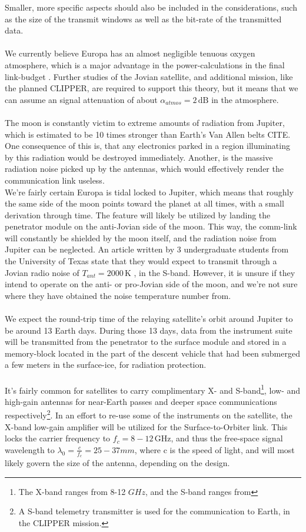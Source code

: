 Smaller, more specific aspects should also be included in the considerations, such as the size of the transmit windows as well as the bit-rate of the transmitted data.\\\\
We currently believe Europa has an almost negligible tenuous oxygen atmosphere, which is a major advantage in the power-calculations in the final link-budget \cite{SciStrat}. Further studies of the Jovian satellite, and additional mission, like the planned CLIPPER, are required to support this theory, but it means that we can assume an signal attenuation of about $\alpha_{atmos}=2\,\mathrm{dB}$ in the atmosphere.\\
\\
The moon is constantly victim to extreme amounts of radiation from Jupiter, which is estimated to be 10 times stronger than Earth's Van Allen belts CITE. One consequence of this is, that any electronics parked in a region illuminating by this radiation would be destroyed immediately. Another, is the massive radiation noise picked up by the antennas, which would effectively render the communication link useless.\\ 
We're fairly certain Europa is tidal locked to Jupiter, which means that roughly the same side of the moon points toward the planet at all times, with a small derivation through time. The feature will likely be utilized by landing the penetrator module on the anti-Jovian side of the moon. This way, the comm-link will constantly be shielded by the moon itself, and the radiation noise from Jupiter can be neglected. An article written by 3 undergraduate students from the University of Texas state that they would expect to transmit through a Jovian radio noise of $T_{ant}=2000\,\mathrm{K}$ \cite{DORRA}, in the S-band. However, it is unsure if they intend to operate on the anti- or pro-Jovian side of the moon, and we're not sure where they have obtained the noise temperature number from.\\
\\
We expect the round-trip time of the relaying satellite's orbit around Jupiter to be around 13 Earth days. During those 13 days, data from the instrument suite will be transmitted from the penetrator to the surface module and stored in a memory-block located in the part of the descent vehicle that had been submerged a few meters in the surface-ice, for radiation protection.\\
\\
It's fairly common for satellites to carry complimentary X- and S-band\footnote{The X-band ranges from 8-12 $GHz$, and the S-band ranges from }, low- and high-gain antennas for near-Earth passes and deeper space communications respectively\footnote{A S-band telemetry transmitter is used for the communication to Earth, in the CLIPPER mission.}. In an effort to re-use some of the instruments on the satellite, the X-band low-gain amplifier will be utilized for the Surface-to-Orbiter link. This locks the carrier frequency to $f_c=8-12\,\mathrm{GHz}$, and thus the free-space signal wavelength to $\lambda_0=\frac{c}{f_c}=25-37mm$, where c is the speed of light, and will most likely govern the size of the antenna, depending on the design.
